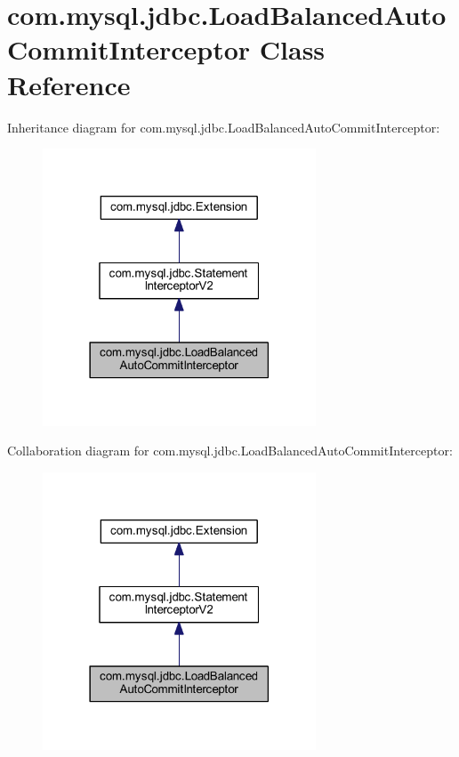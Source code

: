 \hypertarget{classcom_1_1mysql_1_1jdbc_1_1_load_balanced_auto_commit_interceptor}{}\section{com.\+mysql.\+jdbc.\+Load\+Balanced\+Auto\+Commit\+Interceptor Class Reference}
\label{classcom_1_1mysql_1_1jdbc_1_1_load_balanced_auto_commit_interceptor}


Inheritance diagram for com.\+mysql.\+jdbc.\+Load\+Balanced\+Auto\+Commit\+Interceptor\+:
\nopagebreak
\begin{figure}[H]
\begin{center}
\leavevmode
\includegraphics[width=230pt]{classcom_1_1mysql_1_1jdbc_1_1_load_balanced_auto_commit_interceptor__inherit__graph}
\end{center}
\end{figure}


Collaboration diagram for com.\+mysql.\+jdbc.\+Load\+Balanced\+Auto\+Commit\+Interceptor\+:
\nopagebreak
\begin{figure}[H]
\begin{center}
\leavevmode
\includegraphics[width=230pt]{classcom_1_1mysql_1_1jdbc_1_1_load_balanced_auto_commit_interceptor__coll__graph}
\end{center}
\end{figure}
